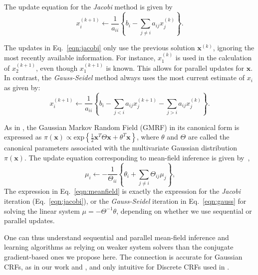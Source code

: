 \documentclass[runningheads]{llncs}
\begin{document}
The update equation for the \emph{Jacobi} method \cite{matrixcomputation} is given by
\begin{equation}
x^{(k+1)}_i \gets  \frac{1}{a_{ii}} \left\lbrace b_i - \sum_{j \neq i} a_{ij}x^{(k)}_j \right\rbrace \text{.}
\label{eqn:jacobi}
\end{equation}

The updates in Eq.~\ref{eqn:jacobi} only use the previous solution $\textbf{x}^{(k)}$, ignoring the most recently
available information. For instance, $x_1^{(k)}$ is used in the calculation of $x_2^{(k+1)}$, even though $x_1^{(k+1)}$
is known. This allows for parallel updates for $\textbf{x}$. In contrast, the \emph{Gauss-Seidel} \cite{matrixcomputation} method always uses the most
current estimate of $x_i$ as given by:
\begin{equation}
x^{(k+1)}_i \gets \frac{1}{a_{ii}} \left\lbrace b_i - \sum_{j < i} a_{ij}x^{(k+1)}_j - \sum_{j > i} a_{ij}x^{(k)}_j\right\rbrace \text{.}
\label{eqn:gauss}
\end{equation}

As in \cite{GMRFbook},
the Gaussian Markov Random Field (GMRF) in its canonical form is expressed as
$\pi(\textbf{x}) \propto \text{exp}\left\lbrace \frac{1}{2} \textbf{x}^T \Theta \textbf{x} + \theta^T\textbf{x} \right\rbrace$, where
$\theta$ and $\Theta$ are called the canonical parameters associated with the multivariate Gaussian distribution $\pi(\textbf{x})$.
The update equation corresponding to mean-field inference is given by~\cite{jordan},
\begin{equation}
\mu_i \gets - \frac{1}{\Theta_{ii}} \left\lbrace \theta_i + \sum_{j \neq i} \Theta_{ij}\mu_j \right\rbrace \text{,}
\label{eqn:meanfield}
\end{equation}
The expression in Eq.~\ref{eqn:meanfield} is exactly the expression for the \emph{Jacobi} iteration (Eq.~\ref{eqn:jacobi}), or the \emph{Gauss-Seidel} iteration in Eq.~\ref{eqn:gauss} for solving the linear system  $\mu = -\Theta^{-1}\theta$,
depending on whether we use sequential or parallel updates.


One can thus understand sequential and parallel mean-field inference and learning algorithms
as relying on weaker system solvers than the conjugate gradient-based ones we propose here. The connection is accurate for Gaussian CRFs, as in our work and \cite{Vemulapalli_2016_CVPR}, and only intuitive for Discrete CRFs used in \cite{crfrnn,deeplab1}. 
\end{document}

